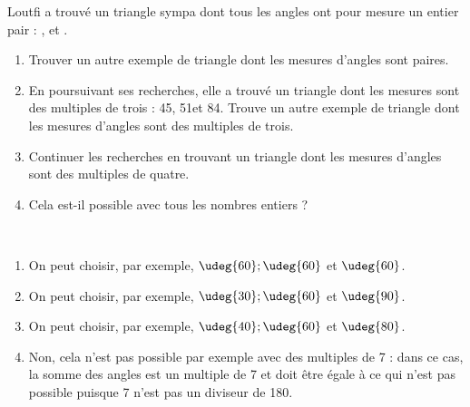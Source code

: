 \begin{colonne*exercice}
\bigskip


\begin{exercice} %
   Loutfi a trouvé un triangle sympa dont tous les angles ont pour mesure un entier pair : ,  et .
   \begin{enumerate}
      \item Trouver un autre exemple de triangle dont les mesures d'angles sont paires.
      \item En poursuivant ses recherches, elle a trouvé un triangle dont les mesures sont des multiples de trois : 45\degre, 51\degre et 84\degre. Trouve un autre exemple de triangle dont les mesures d'angles sont des multiples de trois.
      \item Continuer les recherches en trouvant un triangle dont les mesures d'angles sont des multiples de quatre.
      \item Cela est-il possible avec tous les nombres entiers ?
   \end{enumerate}
\end{exercice}

\begin{corrige}
   \ \\ [-5mm]
   \begin{enumerate}
      \item On peut choisir, par exemple, {\blue $\udeg{60} ; \udeg{60}$ et $\udeg{60}$}.
      \item On peut choisir, par exemple, {\blue $\udeg{30} ; \udeg{60}$ et $\udeg{90}$}.
      \item On peut choisir, par exemple, {\blue $\udeg{40} ; \udeg{60}$ et $\udeg{80}$}.
      \item {\blue Non}, cela n'est pas possible par exemple avec des multiples de 7 : dans ce cas, la somme des angles est un multiple de 7 et doit être égale à  ce qui n'est pas possible puisque 7 n'est pas un diviseur de 180.
   \end{enumerate}
\end{corrige}

\bigskip



\end{colonne*exercice}
